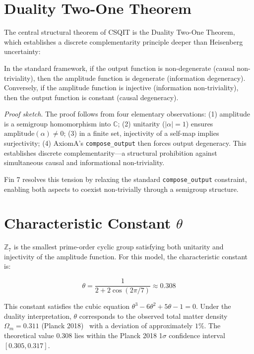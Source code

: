 \documentclass[aps,prl,twocolumn,nofootinbib,floatfix]{revtex4-2}
\begin{document}
\section{Duality Two-One Theorem}

The central structural theorem of CSQIT is the Duality Two-One Theorem, which establishes a discrete complementarity principle deeper than Heisenberg uncertainty:

\begin{theorem}
In the standard framework, if the output function is non-degenerate (causal non-triviality), then the amplitude function is degenerate (information degeneracy). Conversely, if the amplitude function is injective (information non-triviality), then the output function is constant (causal degeneracy).
\end{theorem}

\textit{Proof sketch}. The proof follows from four elementary observations: (1) amplitude is a semigroup homomorphism into $\mathbb{C}$; (2) unitarity ($|\alpha| = 1$) ensures $\text{amplitude}(\alpha) \neq 0$; (3) in a finite set, injectivity of a self-map implies surjectivity; (4) AxiomA's \texttt{compose\_output} then forces output degeneracy. This establishes discrete complementarity---a structural prohibition against simultaneous causal and informational non-triviality.

Fin 7 resolves this tension by relaxing the standard \texttt{compose\_output} constraint, enabling both aspects to coexist non-trivially through a semigroup structure.

\section{Characteristic Constant $\theta$}

$\mathbb{Z}_7$ is the smallest prime-order cyclic group satisfying both unitarity and injectivity of the amplitude function. For this model, the characteristic constant is:

\[
\theta = \frac{1}{2 + 2\cos(2\pi/7)} \approx 0.308
\]

This constant satisfies the cubic equation $\theta^3 - 6\theta^2 + 5\theta - 1 = 0$. Under the duality interpretation, $\theta$ corresponds to the observed total matter density $\Omega_m = 0.311$ (Planck 2018)~\cite{Planck2018} with a deviation of approximately $1\%$. The theoretical value 0.308 lies within the Planck 2018 1$\sigma$ confidence interval $[0.305, 0.317]$.
\end{document}
